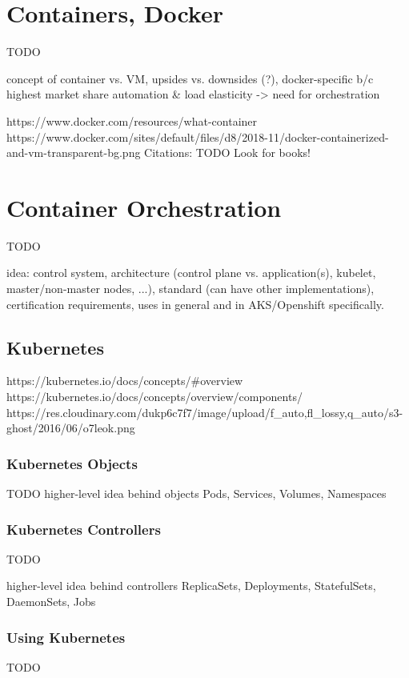 \section{Containers, Docker}
TODO

concept of container vs. VM, upsides vs. downsides (?), docker-specific b/c highest market share
automation \& load elasticity -> need for orchestration

https://www.docker.com/resources/what-container\\
https://www.docker.com/sites/default/files/d8/2018-11/docker-containerized-and-vm-transparent-bg.png
Citations: TODO Look for books! 

\section{Container Orchestration}
TODO

idea: control system, architecture (control plane vs. application(s), kubelet, master/non-master nodes, ...), standard (can have other implementations), certification requirements, uses in general and in AKS/Openshift specifically.

\subsection{Kubernetes}

https://kubernetes.io/docs/concepts/\#overview \\
https://kubernetes.io/docs/concepts/overview/components/
https://res.cloudinary.com/dukp6c7f7/image/upload/f_auto,fl_lossy,q_auto/s3-ghost/2016/06/o7leok.png

\subsubsection{Kubernetes Objects}
TODO
higher-level idea behind objects
Pods, Services, Volumes, Namespaces

\subsubsection{Kubernetes Controllers}
TODO

higher-level idea behind controllers
ReplicaSets, Deployments, StatefulSets, DaemonSets, Jobs

\subsubsection{Using Kubernetes}
TODO

